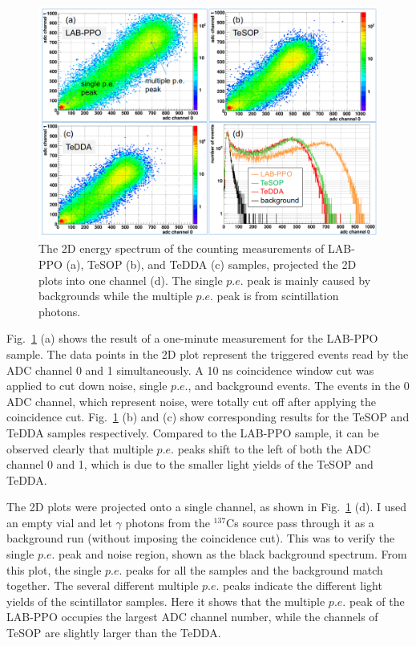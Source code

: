\begin{figure}[htbp]
	\centering	
	\includegraphics[width=14cm]{TeLS_2Denergy.png}
	\caption[The 2D energy spectrum of the counting measurements.]{The 2D energy spectrum of the counting measurements of LAB-PPO (a), TeSOP (b), and TeDDA (c) samples, projected the 2D plots into one channel (d). The single $p.e.$ peak is mainly caused by backgrounds while the multiple $p.e.$ peak is from scintillation photons.}
	\label{teLSresults}
\end{figure}

Fig.~\ref{teLSresults} (a) shows the result of a one-minute measurement for the LAB-PPO sample. The data points in the 2D plot represent the triggered events read by the ADC channel 0 and 1 simultaneously. A 10 ns coincidence window cut was applied to cut down noise, single $p.e.$, and background events. The events in the 0 ADC channel, which represent noise, were totally cut off after applying the coincidence cut. Fig.~\ref{teLSresults} (b) and (c) show corresponding results for the TeSOP and TeDDA samples respectively. Compared to the LAB-PPO sample, it can be observed clearly that multiple $p.e.$ peaks shift to the left of both the ADC channel 0 and 1, which is due to the smaller light yields of the TeSOP and TeDDA.

The 2D plots were projected onto a single channel, as shown in Fig.~\ref{teLSresults} (d). I used an empty vial and let $\gamma$ photons from the $^{137}$Cs source pass through it as a background run (without imposing the coincidence cut). This was to verify the single $p.e.$ peak and noise region, shown as the black background spectrum. From this plot, the single $p.e.$ peaks for all the samples and the background match together. The several different multiple $p.e.$ peaks indicate the different light yields of the scintillator samples. Here it shows that the multiple $p.e.$ peak of the LAB-PPO occupies the largest ADC channel number, while the channels of TeSOP are slightly larger than the TeDDA.

